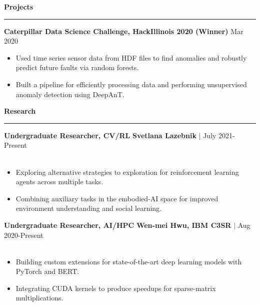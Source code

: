 \documentclass{cv}
\newcommand*{\labelfont}{\fontfamily{bch}\selectfont}
\begin{document}
{\large {\textbf{Projects}}}\vspace*{-6pt}\\
\rule{\textwidth}{0.4pt}
{\labelfont \textbf{Caterpillar Data Science Challenge, HackIllinois 2020 (Winner)} \hspace*{5.9cm} Mar 2020}
{
\small
\begin{itemize}
\setlength\itemsep{-2.5pt}
    \item Used time series sensor data from HDF files to find anomalies and robustly predict future faults via random forests.
    \item Built a pipeline for efficiently processing data and performing unsupervised anomaly detection using DeepAnT.
\end{itemize}
}

{\large {\textbf{Research}}}\vspace*{-6pt}\\
\rule{\textwidth}{0.4pt}

{\labelfont \textbf{Undergraduate Researcher, CV/RL} \hspace*{6.5cm} \textbf{Svetlana Lazebnik} $|$ July 2021-Present}\\
\vspace*{-25pt}\\
{
\small
\begin{itemize}
\setlength\itemsep{-2.5pt}
    \item Exploring alternative strategies to exploration for reinforcement learning agents across multiple tasks.
    \item Combining auxiliary tasks in the embodied-AI space for improved environment understanding and social learning.
\end{itemize}
}

{\labelfont \textbf{Undergraduate Researcher, AI/HPC} \hspace*{5cm} \textbf{Wen-mei Hwu, IBM C3SR} $|$ Aug 2020-Present}\\
\vspace*{-25pt}\\
{
\small
\begin{itemize}
\setlength\itemsep{-2.5pt}
    \item Building custom extensions for state-of-the-art deep learning models with PyTorch and BERT.
    \item Integrating CUDA kernels to produce speedups for sparse-matrix multiplications. 
\end{itemize}
}
\end{document}
